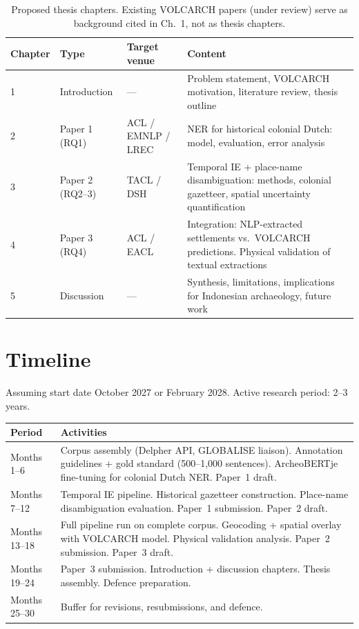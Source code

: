 \documentclass[11pt,a4paper]{article}
\begin{document}
\begin{table}[h]
\centering
\begin{tabular}{@{}lllp{5.5cm}@{}}
\toprule
\textbf{Chapter} & \textbf{Type} & \textbf{Target venue} & \textbf{Content} \\
\midrule
1 & Introduction & --- & Problem statement, VOLCARCH motivation, literature review, thesis outline \\
2 & Paper 1 (RQ1) & ACL / EMNLP / LREC & NER for historical colonial Dutch: model, evaluation, error analysis \\
3 & Paper 2 (RQ2--3) & TACL / DSH & Temporal IE + place-name disambiguation: methods, colonial gazetteer, spatial uncertainty quantification \\
4 & Paper 3 (RQ4) & ACL / EACL & Integration: NLP-extracted settlements vs.\ VOLCARCH predictions. Physical validation of textual extractions \\
5 & Discussion & --- & Synthesis, limitations, implications for Indonesian archaeology, future work \\
\bottomrule
\end{tabular}
\caption{Proposed thesis chapters. Existing VOLCARCH papers (under review) serve as background cited in Ch.~1, not as thesis chapters.}
\end{table}

\section{Timeline}

Assuming start date October 2027 or February 2028. Active research period: 2--3 years.

\begin{table}[h]
\centering
\begin{tabular}{@{}lp{9cm}@{}}
\toprule
\textbf{Period} & \textbf{Activities} \\
\midrule
Months 1--6 & Corpus assembly (Delpher API, GLOBALISE liaison). Annotation guidelines + gold standard (500--1,000 sentences). ArcheoBERTje fine-tuning for colonial Dutch NER. Paper~1 draft. \\
Months 7--12 & Temporal IE pipeline. Historical gazetteer construction. Place-name disambiguation evaluation. Paper~1 submission. Paper~2 draft. \\
Months 13--18 & Full pipeline run on complete corpus. Geocoding + spatial overlay with VOLCARCH model. Physical validation analysis. Paper~2 submission. Paper~3 draft. \\
Months 19--24 & Paper~3 submission. Introduction + discussion chapters. Thesis assembly. Defence preparation. \\
Months 25--30 & Buffer for revisions, resubmissions, and defence. \\
\bottomrule
\end{tabular}
\end{table}
\end{document}
